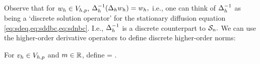 \ede
Observe that for $w_{h} \in V_{h,p},$ $\DeltahI\mleft(\Deltah\wh\mright) = \wh,$ i.e., one can think of $\Delta_{h}^{-1}$ as being a `discrete solution operator' for the stationary diffusion equation \cref{eq:sdeq,eq:sddbc,eq:sdnbc}. I.e., $\Delta_{h}^{-1}$ is a discrete counterpart to $\mathcal S_{n}.$
We can use the higher-order derivative operators to define discrete higher-order norms:

For $v_{h} \in V_{h,p}$ and $m \in \mathbb R$, define
\beqs
\Nmhn{\vh} = .
\eeqs
\ede




